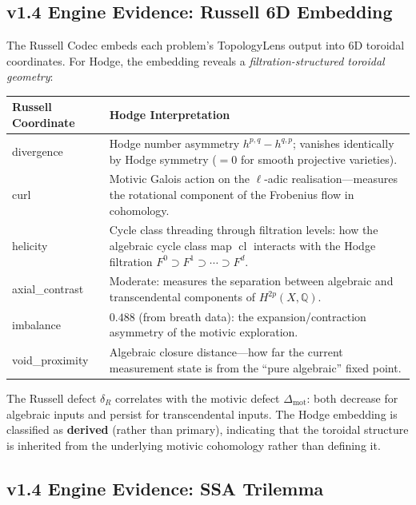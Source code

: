 \documentclass[11pt]{article}
\theoremstyle{definition}
\DeclareMathOperator{\cl}{cl}
\begin{document}
\subsection{v1.4 Engine Evidence: Russell 6D Embedding}
\label{sec:russell}

The Russell Codec embeds each problem's TopologyLens output into 6D
toroidal coordinates.  For Hodge, the embedding reveals a
\emph{filtration-structured toroidal geometry}:

\begin{center}
\begin{tabular}{lp{8.5cm}}
\hline
\textbf{Russell Coordinate} & \textbf{Hodge Interpretation} \\
\hline
divergence &
  Hodge number asymmetry $h^{p,q} - h^{q,p}$; vanishes identically
  by Hodge symmetry ($= 0$ for smooth projective varieties). \\
curl &
  Motivic Galois action on the $\ell$-adic realisation---measures the
  rotational component of the Frobenius flow in cohomology. \\
helicity &
  Cycle class threading through filtration levels: how the algebraic
  cycle class map $\cl$ interacts with the Hodge filtration
  $F^0 \supset F^1 \supset \cdots \supset F^d$. \\
axial\_contrast &
  Moderate: measures the separation between algebraic and transcendental
  components of $H^{2p}(X,\mathbb{Q})$. \\
imbalance &
  $0.488$ (from breath data): the expansion/contraction asymmetry of
  the motivic exploration. \\
void\_proximity &
  Algebraic closure distance---how far the current measurement state is
  from the ``pure algebraic'' fixed point. \\
\hline
\end{tabular}
\end{center}

\noindent
The Russell defect $\delta_R$ correlates with the motivic defect
$\Delta_{\mathrm{mot}}$: both decrease for algebraic inputs and persist
for transcendental inputs.  The Hodge embedding is classified as
\textbf{derived} (rather than primary), indicating that the toroidal
structure is inherited from the underlying motivic cohomology rather
than defining it.

\subsection{v1.4 Engine Evidence: SSA Trilemma}
\label{sec:ssa}
\end{document}
